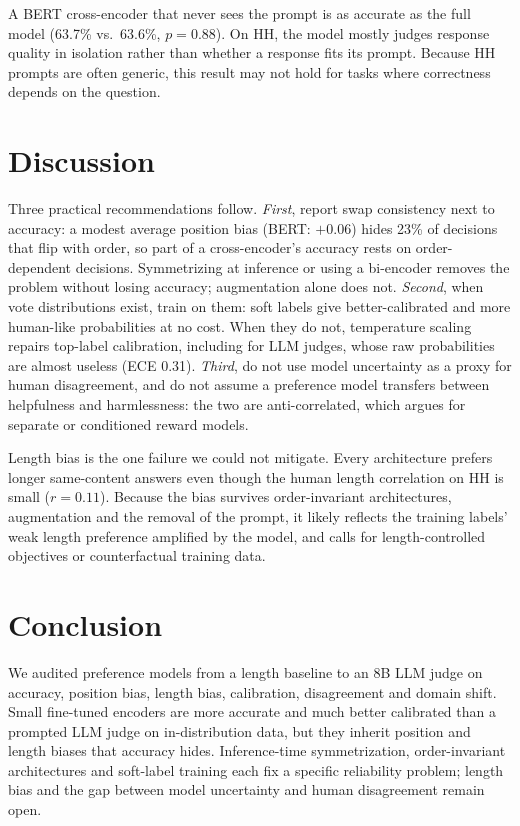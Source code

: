 \documentclass[11pt]{article}
\begin{document}
A BERT cross-encoder that never sees the prompt is as accurate as the full model (63.7\% vs.\ 63.6\%, $p=0.88$). On HH, the model mostly judges response quality in isolation rather than whether a response fits its prompt. Because HH prompts are often generic, this result may not hold for tasks where correctness depends on the question.

\section{Discussion}

Three practical recommendations follow. \emph{First}, report swap consistency next to accuracy: a modest average position bias (BERT: $+0.06$) hides 23\% of decisions that flip with order, so part of a cross-encoder's accuracy rests on order-dependent decisions. Symmetrizing at inference or using a bi-encoder removes the problem without losing accuracy; augmentation alone does not. \emph{Second}, when vote distributions exist, train on them: soft labels give better-calibrated and more human-like probabilities at no cost. When they do not, temperature scaling repairs top-label calibration, including for LLM judges, whose raw probabilities are almost useless (ECE 0.31). \emph{Third}, do not use model uncertainty as a proxy for human disagreement, and do not assume a preference model transfers between helpfulness and harmlessness: the two are anti-correlated, which argues for separate or conditioned reward models.

Length bias is the one failure we could not mitigate. Every architecture prefers longer same-content answers even though the human length correlation on HH is small ($r=0.11$). Because the bias survives order-invariant architectures, augmentation and the removal of the prompt, it likely reflects the training labels' weak length preference amplified by the model, and calls for length-controlled objectives or counterfactual training data.

\section{Conclusion}

We audited preference models from a length baseline to an 8B LLM judge on accuracy, position bias, length bias, calibration, disagreement and domain shift. Small fine-tuned encoders are more accurate and much better calibrated than a prompted LLM judge on in-distribution data, but they inherit position and length biases that accuracy hides. Inference-time symmetrization, order-invariant architectures and soft-label training each fix a specific reliability problem; length bias and the gap between model uncertainty and human disagreement remain open.
\end{document}
